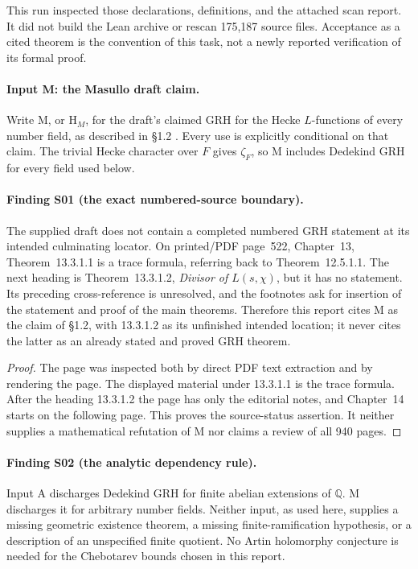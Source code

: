 \documentclass[11pt,a4paper]{article}
\begin{document}
This run inspected those declarations, definitions, and the attached
scan report. It did not build the Lean archive or rescan 175,187
source files. Acceptance as a cited theorem is the convention of
this task, not a newly reported verification of its formal proof.

\paragraph{Input M: the Masullo draft claim.}
Write M, or $\mathrm H_M$, for the draft's claimed GRH for the Hecke
$L$-functions of every number field, as described in \S1.2
\cite{Masullo}. Every use is explicitly conditional on that claim.
The trivial Hecke character over $F$ gives $\zeta_F$, so M includes
Dedekind GRH for every field used below.

\paragraph{Finding S01 (the exact numbered-source boundary).}
The supplied draft does not contain a completed numbered GRH
statement at its intended culminating locator. On printed/PDF
page~522, Chapter~13, Theorem~13.3.1.1 is a trace formula, referring
back to Theorem~12.5.1.1. The next heading is
Theorem~13.3.1.2, \emph{Divisor of $L(s,\chi)$}, but it has no
statement. Its preceding cross-reference is unresolved, and the
footnotes ask for insertion of the statement and proof of the main
theorems. Therefore this report cites M as the claim of \S1.2, with
13.3.1.2 as its unfinished intended location; it never cites the
latter as an already stated and proved GRH theorem.

\begin{proof}
The page was inspected both by direct PDF text extraction and by
rendering the page. The displayed material under 13.3.1.1 is the
trace formula. After the heading 13.3.1.2 the page has only the
editorial notes, and Chapter~14 starts on the following page.
This proves the source-status assertion. It neither supplies a
mathematical refutation of M nor claims a review of all 940 pages.
\end{proof}

\paragraph{Finding S02 (the analytic dependency rule).}
Input A discharges Dedekind GRH for finite abelian extensions of
$\mathbb Q$. M discharges it for arbitrary number fields. Neither
input, as used here, supplies a missing geometric existence theorem,
a missing finite-ramification hypothesis, or a description of an
unspecified finite quotient. No Artin holomorphy conjecture is needed
for the Chebotarev bounds chosen in this report.
\end{document}
